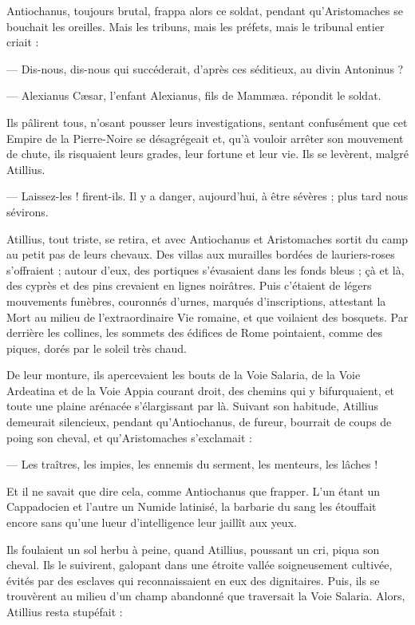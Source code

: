 \documentclass[a4paper, 11pt, oneside, polutonikogreek, french]{article}
\begin{document}
Antiochanus, toujours brutal, frappa alors ce soldat, pendant qu'Aristomaches se bouchait les oreilles. Mais les tribuns, mais les préfets, mais le tribunal entier criait :

--- Dis-nous, dis-nous qui succéderait, d'après ces séditieux, au divin Antoninus ?

--- Alexianus Cæsar, l'enfant Alexianus, fils de Mammæa. répondit le soldat.

Ils pâlirent tous, n'osant pousser leurs investigations, sentant confusément que cet Empire de la Pierre-Noire se désagrégeait et, qu'à vouloir arrêter son mouvement de chute, ils risquaient leurs grades, leur fortune et leur vie. Ils se levèrent, malgré Atillius.

--- Laissez-les ! firent-ils. Il y a danger, aujourd'hui, à être sévères ; plus tard nous sévirons.

Atillius, tout triste, se retira, et avec Antiochanus et Aristomaches sortit du camp au petit pas de leurs chevaux.
Des villas aux murailles bordées de lauriers-roses s'offraient ; autour d'eux, des portiques s'évasaient dans les fonds bleus ; çà et là, des cyprès et des pins crevaient en lignes noirâtres. Puis c'étaient de légers mouvements funèbres, couronnés d'urnes, marqués d'inscriptions, attestant la Mort au milieu de l'extraordinaire Vie romaine, et que voilaient des bosquets. Par derrière les collines, les sommets des édifices de Rome pointaient, comme des piques, dorés par le soleil très chaud.

De leur monture, ils apercevaient les bouts de la Voie Salaria, de la Voie Ardeatina et de la Voie Appia courant droit, des chemins qui y bifurquaient, et toute une plaine arénacée s'élargissant par là. Suivant son habitude, Atillius demeurait silencieux, pendant qu'Antiochanus, de fureur, bourrait de coups de poing son cheval, et qu’Aristomaches s'exclamait :

--- Les traîtres, les impies, les ennemis du serment, les menteurs, les lâches !

Et il ne savait que dire cela, comme Antiochanus que frapper. L'un étant un Cappadocien et l'autre un Numide latinisé, la barbarie du sang les étouffait encore sans qu'une lueur d'intelligence leur jaillît aux yeux.

Ils foulaient un sol herbu à peine, quand Atillius, poussant un cri, piqua son cheval. Ils le suivirent, galopant dans une étroite vallée soigneusement cultivée, évités par des esclaves qui reconnaissaient en eux des dignitaires. Puis, ils se trouvèrent au milieu d'un champ abandonné que traversait la Voie Salaria. Alors, Atillius resta stupéfait :
\end{document}
